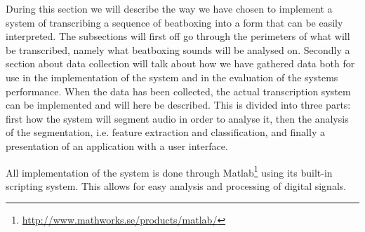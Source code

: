 During this section we will describe the way we have chosen to implement a system of transcribing a sequence of beatboxing into a form that can be easily interpreted. The subsections will first off go through the perimeters of what will be transcribed, namely what beatboxing sounds will be analysed on. Secondly a section about data collection will talk about how we have gathered data both for use in the implementation of the system and in the evaluation of the systems performance. When the data has been collected, the actual transcription system can be implemented and will here be described. This is divided into three parts: first how the system will segment audio in order to analyse it, then the analysis of the segmentation, i.e. feature extraction and classification, and finally a presentation of an application with a user interface.

All implementation of the system is done through Matlab\footnote{\url{http://www.mathworks.se/products/matlab/}} using its built-in scripting system. This allows for easy analysis and processing of digital signals.








